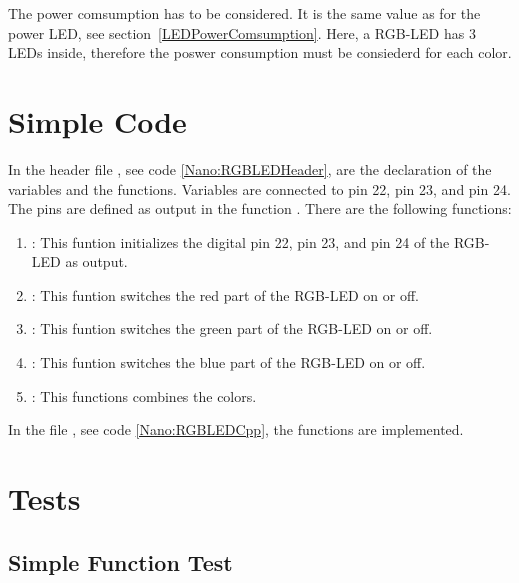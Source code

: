 The power comsumption has to be considered. It is the same value as for the power LED, see section~\ref{LEDPowerComsumption}. Here, a RGB-LED has 3 LEDs inside, therefore the poswer consumption must be consiederd for each color.




\section{Simple Code}


In the header file , see code \ref{Nano:RGBLEDHeader}, are the declaration of the variables and the  functions. Variables are connected to pin 22, pin 23, and pin 24. The pins are defined as output in the function . There are the following functions:

\begin{enumerate}
    \item {}: This funtion initializes the digital pin 22, pin 23, and pin 24 of the RGB-LED as output.
    \item {}: This funtion switches the red part of the RGB-LED  on or off.
    \item {}: This funtion switches the green part of the RGB-LED  on or off.
    \item {}: This funtion switches the blue part of the RGB-LED  on or off.
    \item {}: This functions combines the colors.
\end{enumerate}

{
    \label{Nano:RGBLEDHeader}
}

In the file , see code \ref{Nano:RGBLEDCpp}, the functions are implemented.

{
    \label{Nano:RGBLEDCpp}
}


\section{Tests}

\subsection{Simple Function Test}

